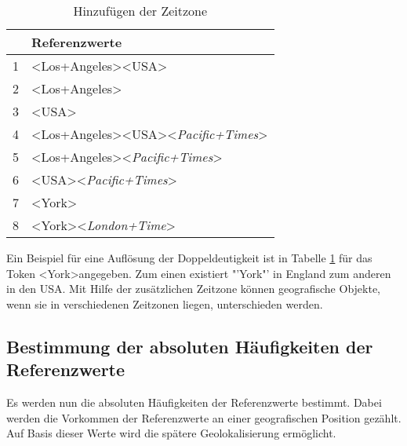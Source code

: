 					\begin{table}[h]
					\centering
					\caption{Hinzufügen der Zeitzone}
					\label{tab:ngramsWithTZ}
					\begin{tabular}{|l|l|}
					\hline
					  & \textbf{Referenzwerte}                                                                     \\ \hline
					1 & \textless Los+Angeles\textgreater\textless USA\textgreater                                   \\ \hline
					2 & \textless Los+Angeles\textgreater                                                           \\ \hline
					3 & \textless USA\textgreater                                                                   \\ \hline
					4 & \textless Los+Angeles\textgreater\textless USA\textgreater\textless \textit{Pacific+Times}\textgreater \\ \hline
					5 & \textless Los+Angeles\textgreater\textless \textit{Pacific+Times}\textgreater               \\ \hline
					6 & \textless USA\textgreater\textless \textit{Pacific+Times}\textgreater                       \\ \hline
					7 & \textless York\textgreater                                                                  \\ \hline
					8 & \textless York\textgreater\textless \textit{London+Time}\textgreater                        \\ \hline
					\end{tabular}
					\end{table}

					Ein Beispiel für eine Auflösung der Doppeldeutigkeit ist in Tabelle \ref{tab:ngramsWithTZ} für das Token \textless York\textgreater  angegeben.
					Zum einen existiert "'York"' in England zum anderen in den USA.  
					Mit Hilfe der zusätzlichen Zeitzone können geografische Objekte, wenn sie in verschiedenen Zeitzonen liegen, unterschieden werden.

		\subsection{Bestimmung der absoluten Häufigkeiten der Referenzwerte} \label{sub:absHaufBestimmen} 

			Es werden nun die absoluten Häufigkeiten der Referenzwerte bestimmt.
			Dabei werden die Vorkommen der Referenzwerte an einer geografischen Position gezählt.
			Auf Basis dieser Werte wird die spätere Geolokalisierung ermöglicht.

